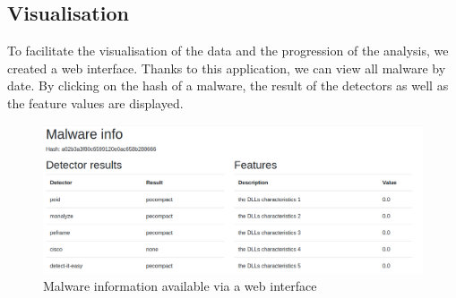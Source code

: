 
\subsection{Visualisation}
To facilitate the visualisation of the data and the progression of the analysis, we created a web interface. Thanks to this application, we can view all malware by date. By clicking on the hash of a malware, the result of the detectors as well as the feature values are displayed.

\begin{figure}[!hb]
\centering
  \includegraphics[width=0.9\linewidth]{Figures/malware_info.png}
  \caption{Malware information available via a web interface}
  \label{fig:KNN}
\end{figure}